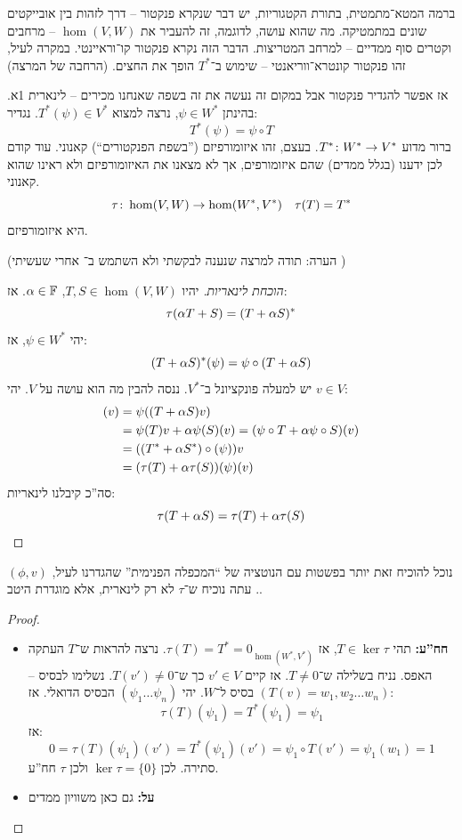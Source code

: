 \documentclass[name=רשימות אלגברה לינארית 2א]{../../../tex/classes/megasumPreamble}
\begin{document}
	ברמה המטא־מתמטית, בתורת הקטגוריות, יש דבר שנקרא פנקטור – דרך לזהות בין אובייקטים שונים במתמטיקה. מה שהוא עושה, לדוגמה, זה להעביר את $\hom(V, W)$ – מרחבים וקטרים סוף ממדיים – למרחב המטריצות. הדבר הזה נקרא פנקטור קו־וראיינטי. במקרה לעיל, זהו פנקטור קונטרא־ווריאנטי – שימוש ב־$T^*$ הופך את החצים. (הרחבה של המרצה)
	
	אז אפשר להגדיר פנקטור אבל במקום זה נעשה את זה בשפה שאנחנו מכירים – לינארית 1א. בהינתן $\psi \in W^*$, נרצה למצוא $T^*(\psi) \in V^*$. נגדיר: 
	\[ T^*(\psi) = \psi \circ T \]
	ברור מדוע $T^* \colon W^* \to V^*$. בעצם, זהו איזומורפיזם (''בשפת הפנקטורים``) קאנוני. עוד קודם לכן ידענו (בגלל ממדים) שהם איזומורפים, אך לא מצאנו את האיזומורפיזם ולא ראינו שהוא קאנוני. 
	\[ \tau \colon \hom(V, W) \to \hom(W^*, V^*) \quad \tau(T) = T^*  \]
	היא איזומורפיזם. 
	
	(הערה: תודה למרצה שנענה לבקשתי ולא השתמש ב־ אחרי שעשיתי )
	\begin{proof}[הוכחת לינאריות]
		יהיו $T, S \in \hom(V, W)$, $\alpha \in \mathbb{F}$. אז: 
		\[ \tau(\alpha T + S) = (T + \alpha S)^* \]
		יהי $\psi \in W^*$, אז: 
		\[ (T + \alpha S)^*(\psi) = \psi \circ (T + \alpha S) \]
		יש למעלה פונקציונל ב־$V^*$. ננסה להבין מה הוא עושה על $V$. יהי $v \in V$: 
		\begin{align*}
			[\psi (T + \ag S)](v) &= \psi((T + \ag S)v) \\ 
			&= \psi(T)v + \ag \psi(S)(v) = (\psi\circ T + \ag \psi\circ S)(v) \\
			&= ((T^* + \ag S^*)\circ (\psi))v \\
			&= (\tau(T) + \ag \tau(S))(\psi)(v)
		\end{align*}
		סה''כ קיבלנו לינאריות: 
		\[ \tau(T + \alpha S) = \tau(T) + \alpha \tau(S) \]
	\end{proof}
	נוכל להוכיח זאת יותר בפשטות עם הנוטציה של ``המכפלה הפנימית'' שהגדרנו לעיל, $(\phi, v)$. 
	עתה נוכיח ש־$\tau$ לא רק לינארית, אלא מוגדרת היטב. 
	\begin{proof}\,
		\begin{itemize}
			\item \textbf{חח''ע: }תהי $T \in \ker \tau$, אז $\tau(T) = T^* = 0_{\hom(W^*, V^*)}$. נרצה להראות ש־$T$ העתקה האפס. נניח בשלילה ש־$T \neq 0$. אז קיים $v' \in V$ כך ש־$T(v') \neq 0$. נשלימו לבסיס – $(T(v) = w_1, w_2 \dots w_n)$ בסיס ל־$W$. יהי $(\psi_1 \dots \psi_n)$ הבסיס הדואלי. אז:
			\[ \tau(T)(\psi_1) = T^*(\psi_1) = \psi_1  \]
			אז: 
			\[ 0 = \tau(T)(\psi_1)(v') = T^*(\psi_1)(v') = \psi_1 \circ T(v') = \psi_1(w_1) = 1 \]
			סתירה. לכן $\ker \tau = \{0\}$ ולכן $\tau$ חח''ע. 
			\item \textbf{על: }גם כאן משוויון ממדים
		\end{itemize}
	\end{proof}
	
\end{document}
